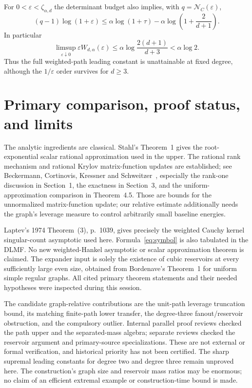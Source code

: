 \documentclass[11pt]{article}
\newcommand{\N}{\mathcal N}
\begin{document}
For $0<\varepsilon<\zeta_{\alpha,d}$ the determinant budget also implies,
with $q=\N_C(\varepsilon)$,
\[
 (q-1)\log(1+\varepsilon)
 \le\alpha\log(1+\tau)-\alpha\log\left(1+\frac2{d+1}\right).
\]
In particular
\[
 \limsup_{\varepsilon\downarrow0}\varepsilon W_{d,\alpha}(\varepsilon)
       \le\alpha\log\frac{2(d+1)}{d+3}<\alpha\log2.
\]
Thus the full weighted-path leading constant is unattainable at fixed
degree, although the $1/\varepsilon$ order survives for $d\ge3$.

\section{Primary comparison, proof status, and limits}
The analytic ingredients are classical. Stahl's Theorem~1 gives the
root-exponential scalar rational approximation used in the upper.
The rational rank mechanism and rational Krylov matrix-function
updates are established; see Beckermann, Cortinovis, Kressner and
Schweitzer~\cite{BCKS}, especially the rank-one discussion in Section~1,
the exactness in Section~3, and the uniform-approximation comparison
in Theorem~4.5. Those are bounds for the unnormalized matrix-function
update; our relative estimate additionally needs the graph's leverage
measure to control arbitrarily small baseline energies.

Laptev's 1974 Theorem~(3), p.~1039, gives precisely the weighted Cauchy
kernel singular-count asymptotic used here. Formula~\eqref{eq:symbol}
is also tabulated in the DLMF. No new weighted-Hankel asymptotic or
scalar approximation theorem is claimed. The expander input is solely
the existence of cubic reservoirs at every sufficiently large even
size, obtained from Bordenave's Theorem~1 for uniform simple regular
graphs. All cited primary theorem statements and their needed
hypotheses were inspected during this session.

The candidate graph-relative contributions are the unit-path
leverage truncation bound, its matching finite-path lower transfer,
the degree-three fanout/reservoir obstruction, and the compulsory
outlier. Internal parallel proof reviews checked the path upper and
the separated-mass algebra; separate reviews checked the reservoir
argument and primary-source specializations. These are not external
or formal verification, and historical priority has not been certified.
The sharp supremal leading constants for degree two and degree three
remain unproved here. The construction's graph size and reservoir
mass ratios may be enormous; no claim of an efficient extremal example
or construction-time bound is made.
\end{document}
